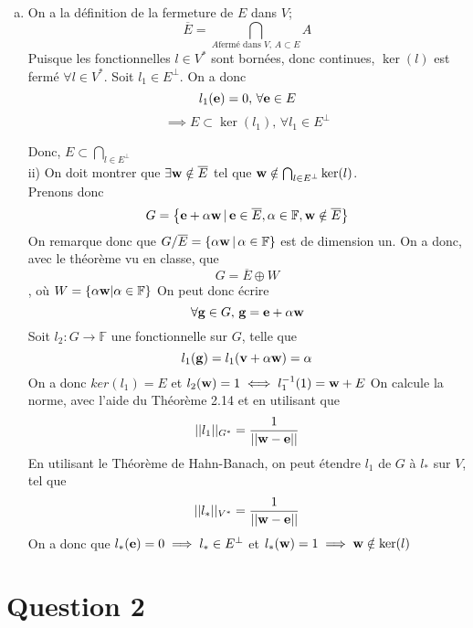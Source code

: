 \documentclass[letterpaper,12pt,oneside,final]{book}
\begin{document}
\begin{enumerate}[a)]
\item %
On a la définition de la fermeture de \( E \) dans \( V \);
\[ \overline{E} = \bigcap_{A\text{fermé dans } V,\,A\subset E} A  \]
Puisque les fonctionnelles \( l \in V^{*} \) sont bornées, donc continues, \( \ker(l) \) est fermé \( \forall l \in  V^{*} \). 
Soit \( l_{1} \in E^{\perp} \). On a donc 
\[ l_{1}(\vb{e}) = 0,\, \forall \vb{e} \in E \]
\[ \implies E \subset \ker(l_{1}),\, \forall l_{1} \in E^{\perp}\]


Donc, \( E \subset \bigcap_{l\in E^{\perp}} \)\\
ii) On doit montrer que \( \exists \vb{w} \notin \overline{E} \) tel que \( \vb{w} \notin \bigcap_{l\in E^{\perp}} \ker(l) \).\\
Prenons donc 
\[ G =\left\{ \vb{e}+\alpha \vb{w}\, |\, \vb{e}\in \overline{E}, \alpha \in \mathbb{F}, \vb{w} \notin \overline{E} \right\}  \]
On remarque donc que \( G/\overline{E} = \left\{\alpha \vb{w}\,|\, \alpha \in \mathbb{F}\right\} \) est de dimension un. 
On a donc, avec le théorème vu en classe, que 
\[ G = \overline{E}\oplus W \],
où \( W = \left\{ \alpha \vb{w} | \alpha \in \mathbb{F}  \right\}  \)
On peut donc écrire 
\[ \forall \vb{g} \in G,\, \vb{g} = \vb{e} +\alpha \vb{w} \]
Soit \( l_{2}: G \rightarrow \mathbb{F} \) une fonctionnelle sur \( G \), telle que 
\[ l_{1}(\vb{g}) = l_{1}(\vb{v}+\alpha \vb{w}) = \alpha\]
On a donc \( ker(l_{1}) = E \) et \( l_{2}(\vb{w}) = 1 \iff l_{1}^{-1}(1)= \vb{w}+E \)
On calcule la norme, avec l'aide du Théorème 2.14 et en utilisant que 
\[ \lvert \lvert  l_{1} \rvert \rvert_{G^{*}} = \frac{1}{ \lvert \lvert  \vb{w}-\vb{e} \rvert \rvert} \]
En utilisant le Théorème de Hahn-Banach, on peut étendre \( l_{1} \) de \( G  \) à \( l_{*} \) sur \( V \), tel que
\[ \lvert \lvert  l_{*} \rvert \rvert_{V^{*}} = \frac{1}{\lvert \lvert  \vb{w}-\vb{e} \rvert \rvert } \]
On a donc que \( l_{*}(\vb{e}) = 0 \implies l_{*} \in E^{\perp} \) et \( l_{*}(\vb{w}) =1 \implies \vb{w}\notin \ker(l) \)\\



\end{enumerate}



\newpage
\section*{Question 2}
\end{document}
